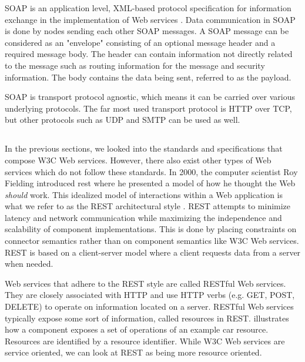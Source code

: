 SOAP is an application level, XML-based protocol specification for information
exchange in the implementation of Web services \cite{w3c-soap}. Data
communication in SOAP is done by nodes sending each other SOAP messages. A SOAP
message can be considered as an "envelope" consisting of an optional message
header and a required message body. The header can contain information not
directly related to the message such as routing information for the message and
security information. The body contains the data being sent, referred to as the
payload.

SOAP is transport protocol agnostic, which means it can be carried over various
underlying protocols. The far most used transport protocol is HTTP over TCP, but
other protocols such as UDP and SMTP can be used as well.

\subsection{}
\label{rest}

In the previous sections, we looked into the standards and specifications that
compose W3C Web services. However, there also exist other types of Web services
which do not follow these standards. In 2000, the computer scientist Roy
Fielding introduced \gls{rest} where he presented a model of how he thought the
Web \textit{should} work. This idealized model of interactions within a Web
application is what we refer to as the REST architectural style
\cite{rest-fielding}. REST attempts to minimize latency and network
communication while maximizing the independence and scalability of component
implementations. This is done by placing constraints on connector semantics
rather than on component semantics like W3C Web services.  REST is based on a
client-server model where a client requests data from a server when needed.

Web services that adhere to the REST style are called RESTful Web services. They
are closely associated with HTTP and use HTTP verbs (e.g. GET, POST, DELETE) to
operate on information located on a server. RESTful Web services typically
expose some sort of information, called resources in REST. 
illustrates how a component exposes a set of operations of an example car
resource. Resources are identified by a resource identifier. While W3C Web
services are service oriented, we can look at REST as being more resource
oriented.

